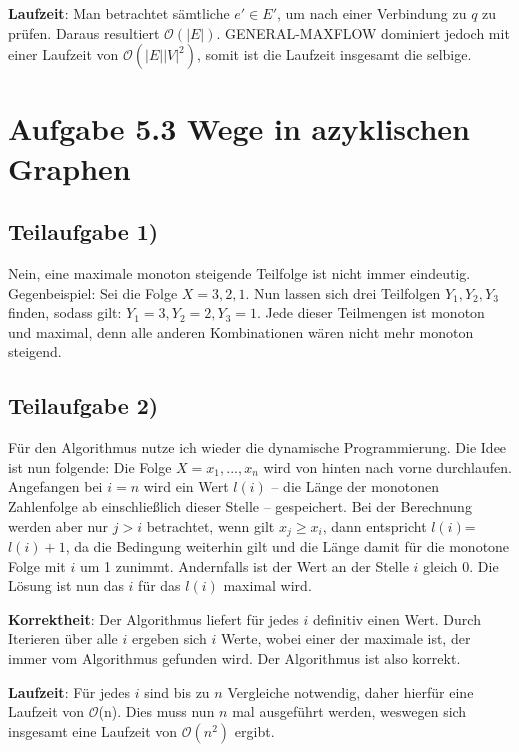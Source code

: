 \documentclass[a4paper, fontsize=10pt]{scrartcl}
\begin{document}
\textbf{Laufzeit}: Man betrachtet sämtliche $e' \in E'$, um nach einer Verbindung zu $q$ zu prüfen. Daraus resultiert $\mathcal{O}(|E|)$. GENERAL-MAXFLOW dominiert jedoch mit einer Laufzeit von $\mathcal{O}(|E||V|^{2})$, somit ist die Laufzeit insgesamt die selbige.


\section*{Aufgabe 5.3 Wege in azyklischen Graphen}
\subsection*{Teilaufgabe 1)}
Nein, eine maximale monoton steigende Teilfolge ist nicht immer eindeutig. Gegenbeispiel:
Sei die Folge $X=3,2,1$. Nun lassen sich drei Teilfolgen $Y_1,Y_2,Y_3$ finden, sodass gilt: $Y_1=3,Y_2=2,Y_3=1$. Jede dieser Teilmengen ist monoton und maximal, denn alle anderen Kombinationen wären nicht mehr monoton steigend.

\subsection*{Teilaufgabe 2)}
Für den Algorithmus nutze ich wieder die dynamische Programmierung. Die Idee ist nun folgende:
Die Folge $X=x_1,...,x_n$ wird von hinten nach vorne durchlaufen. Angefangen bei $i=n$ wird ein Wert $l(i)$ -- die Länge der monotonen Zahlenfolge ab einschließlich dieser Stelle -- gespeichert. Bei der Berechnung werden aber nur $j>i$ betrachtet, wenn gilt $x_j\geq x_i$, dann entspricht $l(i)$=$l(i)+1$, da die Bedingung weiterhin gilt und die Länge damit für die monotone Folge mit $i$ um 1 zunimmt. Andernfalls ist der Wert an der Stelle $i$ gleich 0. Die Lösung ist nun das $i$ für das $l(i)$ maximal wird.\bigskip

\textbf{Korrektheit}: Der Algorithmus liefert für jedes $i$ definitiv einen Wert. Durch Iterieren über alle $i$ ergeben sich $i$ Werte, wobei einer der maximale ist, der immer vom Algorithmus gefunden wird. Der Algorithmus ist also korrekt.\bigskip

\textbf{Laufzeit}: Für jedes $i$ sind bis zu $n$ Vergleiche notwendig, daher hierfür eine Laufzeit von $\mathcal{O}$(n). Dies muss nun $n$ mal ausgeführt werden, weswegen sich insgesamt eine Laufzeit von $\mathcal{O}(n^2)$ ergibt. 
\end{document}

